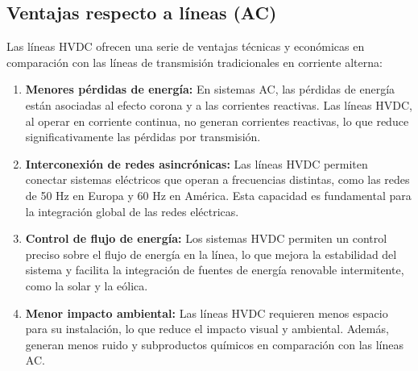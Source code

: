 \subsection{Ventajas respecto a líneas (AC)}
Las líneas HVDC ofrecen una serie de ventajas técnicas y económicas en comparación con las líneas de transmisión tradicionales en corriente alterna:
\begin{enumerate}
    \item \textbf{Menores pérdidas de energía:} 
    En sistemas AC, las pérdidas de energía están asociadas al efecto corona y a las corrientes reactivas. Las líneas HVDC, al operar en corriente continua, no generan corrientes reactivas, lo que reduce significativamente las pérdidas por transmisión.

    \item \textbf{Interconexión de redes asincrónicas:} 
    Las líneas HVDC permiten conectar sistemas eléctricos que operan a frecuencias distintas, como las redes de 50 Hz en Europa y 60 Hz en América. Esta capacidad es fundamental para la integración global de las redes eléctricas.

    \item \textbf{Control de flujo de energía:} 
    Los sistemas HVDC permiten un control preciso sobre el flujo de energía en la línea, lo que mejora la estabilidad del sistema y facilita la integración de fuentes de energía renovable intermitente, como la solar y la eólica.

    \item \textbf{Menor impacto ambiental:} 
    Las líneas HVDC requieren menos espacio para su instalación, lo que reduce el impacto visual y ambiental. Además, generan menos ruido y subproductos químicos en comparación con las líneas AC.
\end{enumerate}

